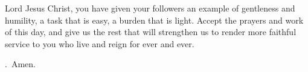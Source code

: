 \lettrine[loversize=0.15,lines=2]{L}{}ord Jesus Christ,
you have given your followers
an example of gentleness and humility,
a task that is easy, a burden that is light.
Accept the prayers and work of this day,
and give us the rest that will strengthen us
to render more faithful service to you
who live and reign for ever and ever.
\par \Rbar.~Amen.
